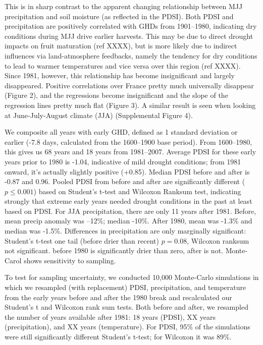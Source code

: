 \documentclass{nature}
\begin{document}
\indent This is in sharp contrast to the apparent changing relationship between MJJ precipitation and soil moisture (as reflected in the PDSI). Both PDSI and precipitation are positively correlated with GHDs from 1901--1980, indicating dry conditions during MJJ drive earlier harvests. This may be due to direct drought impacts on fruit maturation (ref XXXX), but is more likely due to indirect influences via land-atmosphere feedbacks, namely the tendency for dry conditions to lead to warmer temperatures and vice versa  over this region (ref XXXX). Since 1981, however, this relationship has become insignificant and largely disappeared. Positive correlations over France pretty much universally disappear (Figure 2), and the regressions become insignificant and the slope of the regression lines pretty much flat (Figure 3). A similar result is seen when looking at June-July-August climate (JJA) (Supplemental Figure 4).\\
\indent 

\indent We composite all years with early GHD, defined as 1 standard deviation or earlier (-7.8 days, calculated from the 1600--1900 base period). From 1600--1980, this gives us 68 years and 18 years from 1981--2007. Average PDSI for these early years prior to 1980 is -1.04, indicative of mild drought conditions; from 1981 onward, it's actually slightly positive (+0.85). Median PDSI before and after is -0.87 and 0.96. Pooled PDSI from before and after are significantly different ($p\le0.001$) based on Student's t-test and Wilcoxon Ranksum test, indicating strongly that extreme early years needed drought conditions in the past at least based on PDSI. For JJA precipitation, there are only 11 years after 1981. Before, mean precip anomaly was --12\%; median -10\%. After 1980, mean was -1.3\% and median was -1.5\%. Differences in precipitation are only marginally significant: Student's t-test one tail (before drier than recent) $p=0.08$, Wilcoxon ranksum not significant. before 1980 is significantly drier than zero, after is not. Monte-Carol shows sensitivity to sampling.\\
\indent 

\indent To test for sampling uncertainty, we conducted 10,000 Monte-Carlo simulations in which we resampled (with replacement) PDSI, precipitation, and temperature from the early years before and after the 1980 break and recalculated our Student's t and Wilcoxon rank sum tests. Both before and after, we resampled the number of years available after 1981: 18 years (PDSI), XX years (precipitation), and XX years (temperature). For PDSI, 95\% of the simulations were still significantly different Student's t-test; for Wilcoxon it was 89\%.
\end{document}
